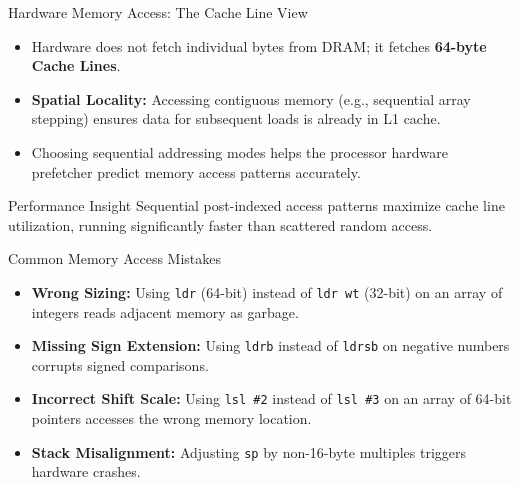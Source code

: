 \documentclass[aspectratio=169,11pt,t]{beamer}
\newcommand{\key}[1]{\textbf{#1}}
\newcommand{\bits}[1]{\texttt{#1}}
\newcommand{\code}[1]{\texttt{#1}}
\begin{document}

\begin{frame}{Hardware Memory Access: The Cache Line View}
\large
\begin{itemize}\setlength{\itemsep}{6pt}
  \item Hardware does not fetch individual bytes from DRAM; it fetches \key{64-byte Cache Lines}.
  \item \key{Spatial Locality:} Accessing contiguous memory (e.g., sequential array stepping) ensures data for subsequent loads is already in L1 cache.
  \item Choosing sequential addressing modes helps the processor hardware prefetcher predict memory access patterns accurately.
\end{itemize}

\vspace{0.25cm}
\begin{block}{Performance Insight}
Sequential post-indexed access patterns maximize cache line utilization, running significantly faster than scattered random access.
\end{block}
\end{frame}


\begin{frame}{Common Memory Access Mistakes}
\large
\begin{itemize}\setlength{\itemsep}{6pt}
  \item \key{Wrong Sizing:} Using \code{ldr} (64-bit) instead of \code{ldr wt} (32-bit) on an array of integers reads adjacent memory as garbage.
  \item \key{Missing Sign Extension:} Using \code{ldrb} instead of \code{ldrsb} on negative numbers corrupts signed comparisons.
  \item \key{Incorrect Shift Scale:} Using \code{lsl \#2} instead of \code{lsl \#3} on an array of 64-bit pointers accesses the wrong memory location.
  \item \key{Stack Misalignment:} Adjusting \bits{sp} by non-16-byte multiples triggers hardware crashes.
\end{itemize}
\end{frame}

\end{document}

